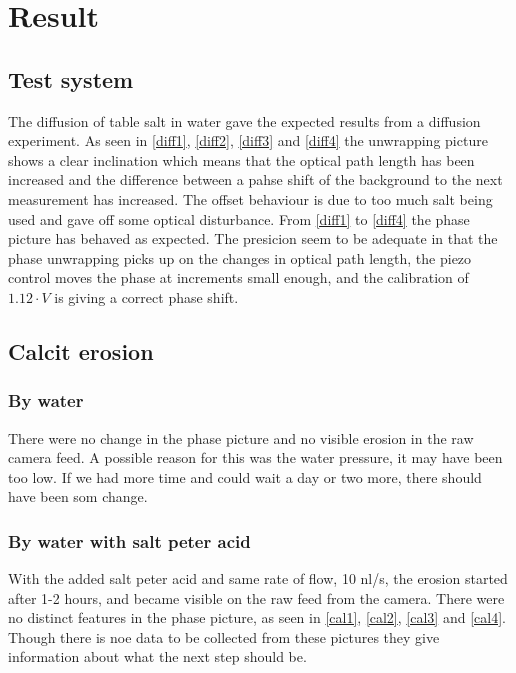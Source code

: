 \section {Result}
\subsection {Test system}
The diffusion of table salt in water gave the expected results from a diffusion
experiment. As seen in \autoref {diff1}, \autoref {diff2}, \autoref {diff3} and 
\autoref {diff4} the unwrapping picture shows a clear inclination which means that
the optical path length has been increased and the difference between a pahse shift
of the background to the next measurement has increased. The offset behaviour is
due to too much salt being used and gave off some optical disturbance. From 
\autoref {diff1} to \autoref {diff4} the phase picture has behaved as expected.
The presicion seem to be adequate in that the phase unwrapping picks up on the
changes in optical path length, the piezo control moves the phase at increments
small enough, and the calibration of $1.12\cdot V$ is giving a correct phase shift.

\subsection {Calcit erosion}
\subsubsection {By water}
There were no change in the phase picture and no visible erosion in the raw camera
feed. A possible reason for this was the water pressure, it may have been too low.
If we had more time and could wait a day or two more, there should have been som change.

\subsubsection {By water with salt peter acid}
With the added salt peter acid and same rate of flow, 10 nl/s, the erosion started 
after 1-2 hours, and became visible on the raw feed from the camera. There were no
distinct features in the phase picture, as seen in \autoref {cal1}, \autoref {cal2},
\autoref {cal3} and \autoref {cal4}. Though there is noe data to be collected from
these pictures they give information about what the next step should be.


